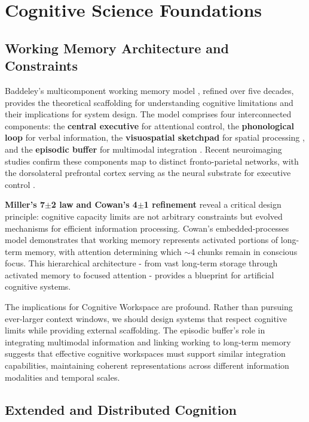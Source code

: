 \documentclass[10pt,twocolumn]{article}
\begin{document}
\section{Cognitive Science Foundations}

\subsection{Working Memory Architecture and Constraints}

Baddeley's multicomponent working memory model \cite{baddeley1974working, baddeley2000episodic}, refined over five decades, provides the theoretical scaffolding for understanding cognitive limitations and their implications for system design. The model comprises four interconnected components: the \textbf{central executive} for attentional control, the \textbf{phonological loop} for verbal information, the \textbf{visuospatial sketchpad} for spatial processing \cite{logie1986visuo}, and the \textbf{episodic buffer} for multimodal integration \cite{baddeley2000episodic}. Recent neuroimaging studies confirm these components map to distinct fronto-parietal networks, with the dorsolateral prefrontal cortex serving as the neural substrate for executive control \cite{chai2018working}.

\textbf{Miller's 7$\pm$2 law} \cite{miller1956magical} \textbf{and Cowan's 4$\pm$1 refinement} \cite{cowan2001magical} reveal a critical design principle: cognitive capacity limits are not arbitrary constraints but evolved mechanisms for efficient information processing. Cowan's embedded-processes model \cite{cowan1999embedded} demonstrates that working memory represents activated portions of long-term memory, with attention determining which $\sim$4 chunks remain in conscious focus. This hierarchical architecture - from vast long-term storage through activated memory to focused attention - provides a blueprint for artificial cognitive systems.

The implications for Cognitive Workspace are profound. Rather than pursuing ever-larger context windows, we should design systems that respect cognitive limits while providing external scaffolding. The episodic buffer's role in integrating multimodal information and linking working to long-term memory suggests that effective cognitive workspaces must support similar integration capabilities, maintaining coherent representations across different information modalities and temporal scales.

\subsection{Extended and Distributed Cognition}
\end{document}
